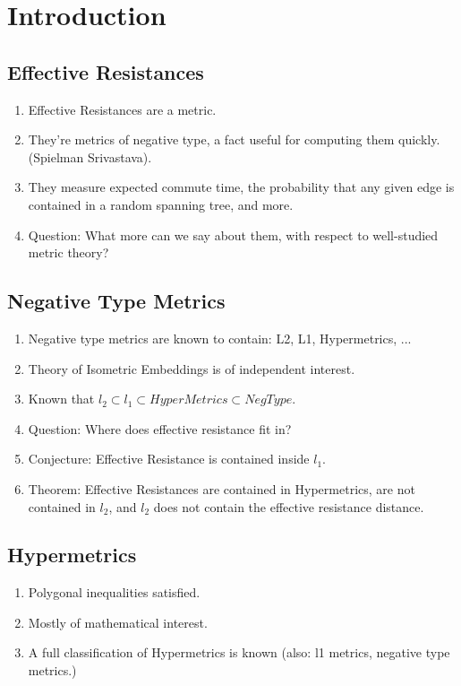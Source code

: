 \section{Introduction}
\subsection{Effective Resistances}
\begin{enumerate}
\item Effective Resistances are a metric.
\item They're metrics of negative type, a fact useful for computing them quickly.
(Spielman Srivastava).
\item They measure expected commute time, the probability that any given
edge is contained in a random spanning tree, and more.
\item Question: What more can we say about them, with respect to
well-studied metric theory?
\end{enumerate}

\subsection{Negative Type Metrics}
\begin{enumerate}
\item Negative type metrics are known to contain: L2, L1, Hypermetrics,
  ...
\item Theory of Isometric Embeddings is of independent interest.
\item Known that $l_2 \subset l_1 \subset HyperMetrics \subset NegType$.
\item Question: Where does effective resistance fit in? 
\item Conjecture: Effective Resistance is contained inside $l_1$.
\item Theorem: Effective Resistances are contained in Hypermetrics, are
not contained in $l_2$, and $l_2$ does not contain the effective
resistance distance.
\end{enumerate}
\subsection{Hypermetrics}
\begin{enumerate}
\item Polygonal inequalities satisfied.
\item Mostly of mathematical interest.
\item A full classification of Hypermetrics is known (also: l1 metrics,
    negative type metrics.)
\end{enumerate}


